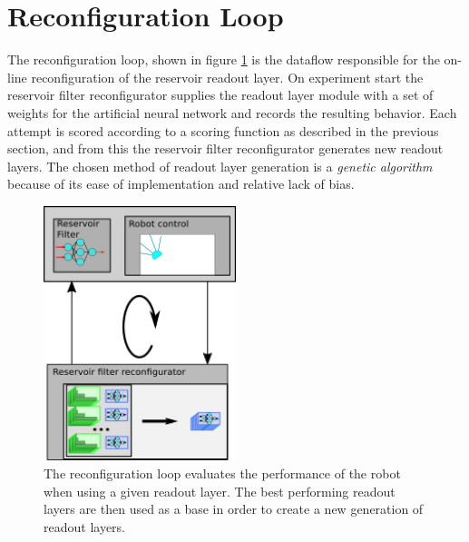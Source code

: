 \section{Reconfiguration Loop}
The reconfiguration loop, shown in figure \ref{figReconfLoop} is the dataflow
responsible for the on-line reconfiguration of the reservoir readout layer.
On experiment start the reservoir filter reconfigurator supplies the readout
layer module with a set of weights for the artificial neural network and records
the resulting behavior.
Each attempt is scored according to a scoring function as described in the
previous section, and from this the reservoir filter reconfigurator generates
new readout layers.
The chosen method of readout layer generation is a \emph{genetic algorithm}
because of its ease of implementation and relative lack of bias.
\begin{figure}[h!]
  \centering
  \includegraphics[width=0.5\textwidth]{fig/reconfigLoop.png}
  \caption{
    The reconfiguration loop evaluates the performance of the robot when using a
    given readout layer.
    The best performing readout layers are then used as a base in order to
    create a new generation of readout layers.
  }
  \label{figReconfLoop}
\end{figure}
\cleardoublepage

